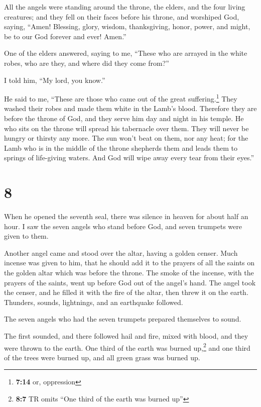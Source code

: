  All the angels were standing around the throne, the
elders, and the four living creatures; and they fell on their faces
before his throne, and worshiped God,  saying, ``Amen!
Blessing, glory, wisdom, thanksgiving, honor, power, and might, be to
our God forever and ever! Amen.''

 One of the elders answered, saying to me, ``These who
are arrayed in the white robes, who are they, and where did they come
from?''

 I told him, ``My lord, you know.''

He said to me, ``These are those who came out of the great
suffering.\footnote{\textbf{7:14} or, oppression} They washed their
robes and made them white in the Lamb's blood.  Therefore
they are before the throne of God, and they serve him day and night in
his temple. He who sits on the throne will spread his tabernacle over
them.  They will never be hungry or thirsty any more. The
sun won't beat on them, nor any heat;  for the Lamb who
is in the middle of the throne shepherds them and leads them to springs
of life-giving waters. And God will wipe away every tear from their
eyes.''

\hypertarget{section-7}{%
\section{8}\label{section-7}}

 When he opened the seventh seal, there was silence in
heaven for about half an hour.  I saw the seven angels who
stand before God, and seven trumpets were given to them.

 Another angel came and stood over the altar, having a
golden censer. Much incense was given to him, that he should add it to
the prayers of all the saints on the golden altar which was before the
throne.  The smoke of the incense, with the prayers of the
saints, went up before God out of the angel's hand.  The
angel took the censer, and he filled it with the fire of the altar, then
threw it on the earth. Thunders, sounds, lightnings, and an earthquake
followed.

 The seven angels who had the seven trumpets prepared
themselves to sound.

 The first sounded, and there followed hail and fire,
mixed with blood, and they were thrown to the earth. One third of the
earth was burned up,\footnote{\textbf{8:7} TR omits ``One third of the
  earth was burned up''} and one third of the trees were burned up, and
all green grass was burned up.

